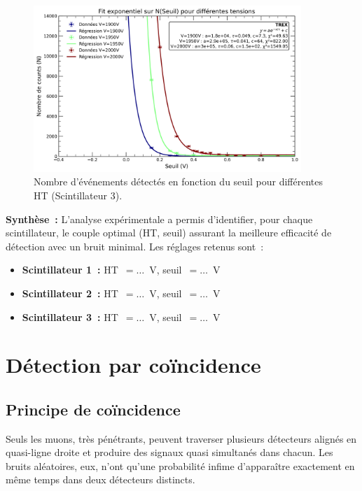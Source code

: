\documentclass[a4paper,12pt,twoside]{article}
\begin{document}
\begin{figure}[H]
    \centering
    \includegraphics[width=0.9\textwidth]{Images/Threshold_Scintillateur_3.png}
    \caption{Nombre d’événements détectés en fonction du seuil pour différentes HT (Scintillateur 3).}
    \label{fig:optimisation_scint3}
\end{figure}


\begin{remarque}
\textbf{Synthèse~:} L’analyse expérimentale a permis d’identifier, pour chaque scintillateur, le couple optimal (HT, seuil) assurant la meilleure efficacité de détection avec un bruit minimal. Les réglages retenus sont~:
\begin{itemize}
    \item \textbf{Scintillateur 1~:} HT~$=\ldots$~V, seuil~$=\ldots$~V
    \item \textbf{Scintillateur 2~:} HT~$=\ldots$~V, seuil~$=\ldots$~V
    \item \textbf{Scintillateur 3~:} HT~$=\ldots$~V, seuil~$=\ldots$~V
\end{itemize}
\end{remarque}

\newpage

\section{Détection par coïncidence}
\subsection{Principe de coïncidence}

\vspace{1em}
\begin{center}
\begin{tcolorbox}[colback=blue!5!white, colframe=blue!60!black, title=Principe de la coïncidence]
Seuls les muons, très pénétrants, peuvent traverser plusieurs détecteurs alignés en quasi-ligne droite et produire des signaux quasi simultanés dans chacun. Les bruits aléatoires, eux, n’ont qu’une probabilité infime d’apparaître exactement en même temps dans deux détecteurs distincts.
\end{tcolorbox}
\end{center}
\end{document}
